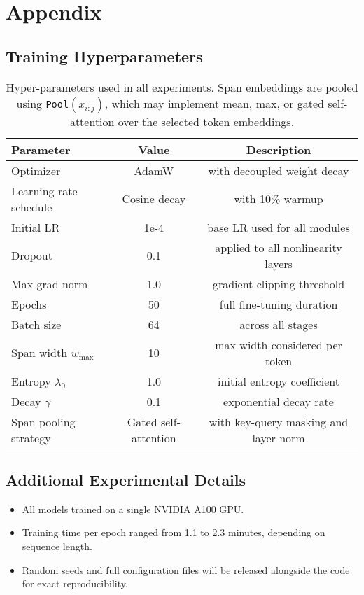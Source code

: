 \appendix
\section*{Appendix}

\subsection{Training Hyperparameters}
\label{sec:hyperparams}

\begin{table}[H]
	\centering
	\begin{tabular}{@{}lcc@{}}
		\toprule
		Parameter & Value & Description \\
		\midrule
		Optimizer & AdamW & with decoupled weight decay \\
		Learning rate schedule & Cosine decay & with 10\% warmup \\
		Initial LR & 1e-4 & base LR used for all modules \\
		Dropout & 0.1 & applied to all nonlinearity layers \\
		Max grad norm & 1.0 & gradient clipping threshold \\
		Epochs & 50 & full fine-tuning duration \\
		Batch size & 64 & across all stages \\
		Span width $w_{\max}$ & 10 & max width considered per token \\
		Entropy $\lambda_0$ & 1.0 & initial entropy coefficient \\
		Decay $\gamma$ & 0.1 & exponential decay rate \\
		Span pooling strategy & Gated self-attention & with key-query masking and layer norm \\
		\bottomrule
	\end{tabular}
	\caption{Hyper-parameters used in all experiments. Span embeddings are pooled using \texttt{Pool}$(x_{i:j})$, which may implement mean, max, or gated self-attention over the selected token embeddings.}
\end{table}

\subsection{Additional Experimental Details}
\label{sec:extra-exp}

\begin{itemize}[leftmargin=1.5em]
	\item All models trained on a single NVIDIA A100 GPU.
	\item Training time per epoch ranged from 1.1 to 2.3 minutes, depending on sequence length.
	\item Random seeds and full configuration files will be released alongside the code for exact reproducibility.
\end{itemize}

